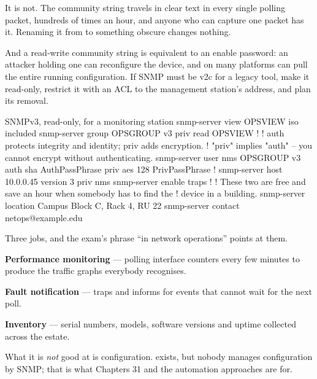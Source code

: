 \begin{alertbox}
It is not. The community string travels in clear text in every single polling
packet, hundreds of times an hour, and anyone who can capture one packet has it.
Renaming it from  to something obscure changes nothing.

And a read-write community string is equivalent to an enable password: an
attacker holding one can reconfigure the device, and on many platforms can pull
the entire running configuration. If SNMP must be v2c for a legacy tool, make it
read-only, restrict it with an ACL to the management station's address, and plan
its removal.
\end{alertbox}

\begin{config}{SNMPv3, read-only, for a monitoring station}
snmp-server view OPSVIEW iso included
snmp-server group OPSGROUP v3 priv read OPSVIEW
!
! auth protects integrity and identity; priv adds encryption.
! "priv" implies "auth" -- you cannot encrypt without authenticating.
snmp-server user nms OPSGROUP v3 auth sha AuthPassPhrase priv aes 128 PrivPassPhrase
!
snmp-server host 10.0.0.45 version 3 priv nms
snmp-server enable traps
!
! These two are free and save an hour when somebody has to find the
! device in a building.
snmp-server location Campus Block C, Rack 4, RU 22
snmp-server contact netops@example.edu
\end{config}

\begin{conceptbox}
Three jobs, and the exam's phrase ``in network operations'' points at them.

\begin{tight}
  \item \textbf{Performance monitoring} --- polling interface counters every few
        minutes to produce the traffic graphs everybody recognises.
  \item \textbf{Fault notification} --- traps and informs for events that cannot
        wait for the next poll.
  \item \textbf{Inventory} --- serial numbers, models, software versions and
        uptime collected across the estate.
\end{tight}

What it is \emph{not} good at is configuration.  exists, but nobody
manages configuration by SNMP; that is what Chapters 31 and the automation
approaches are for.
\end{conceptbox}

